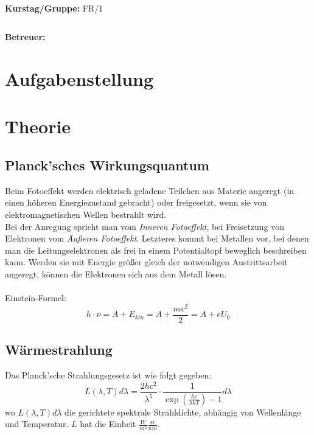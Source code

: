 \documentclass[12pt]{article}
\begin{document}
\begin{verbatim}


\end{verbatim}
			\begin{flushleft}
			\textbf{\Large{Kurstag/Gruppe:}} \Large{FR/1}
			\end{flushleft}

\begin{verbatim}

\end{verbatim}
			\begin{flushleft}
			\LARGE{\textbf{Betreuer:\Large{ }}}		
			\end{flushleft}
\newpage
			
\section{Aufgabenstellung}
\section{Theorie}
\subsection{Planck'sches Wirkungsquantum}
Beim Fotoeffekt werden elektrisch geladene Teilchen aus Materie angeregt (in einen höheren Energiezustand gebracht) oder freigesetzt, wenn sie von elektromagnetischen Wellen bestrahlt wird.\\
Bei der Anregung spricht man vom \textit{Inneren Fotoeffekt}, bei Freisetzung von Elektronen vom \textit{Äußeren Fotoeffekt}. Letzteres kommt bei Metallen vor, bei denen man die Leitungselektronen als frei in einem Potentialtopf beweglich beschreiben kann. Werden sie mit Energie größer gleich der notwendigen Austrittsarbeit angeregt, können die Elektronen sich aus dem Metall lösen.\\
\\
Einstein-Formel:
$$h\cdot\nu=A+E_{kin}=A+\frac{mv^2}{2}=A+eU_0$$


\subsection{Wärmestrahlung}
Das Planck'sche Strahlungsgesetz ist wie folgt gegeben:
\begin{equation}
L(\lambda,T)d\lambda = \frac{2hc^2}{\lambda^5} \cdot \frac{1}{\exp\left(\frac{hc}{\lambda kT}\right) -1} d\lambda
\label{strahlungsgesetz}
\end{equation}
wo $L(\lambda,T)d\lambda$ die gerichtete spektrale Strahldichte, abhängig von Wellenlänge und Temperatur. $L$ hat die Einheit $\frac{W}{m^2}\frac{sr}{nm}$.\\
\\
\end{document}
